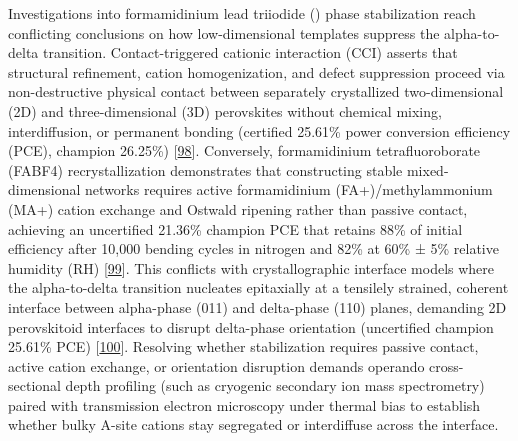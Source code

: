\documentclass[
  11pt,
]{article}
\begin{document}
Investigations into formamidinium lead triiodide () phase
stabilization reach conflicting conclusions on how low-dimensional
templates suppress the alpha-to-delta transition. Contact-triggered
cationic interaction (CCI) asserts that structural refinement, cation
homogenization, and defect suppression proceed via non-destructive
physical contact between separately crystallized two-dimensional (2D)
and three-dimensional (3D) perovskites without chemical mixing,
interdiffusion, or permanent bonding (certified 25.61\% power conversion
efficiency (PCE), champion 26.25\%)
{[}\href{https://doi.org/10.1038/s41560-026-02027-4}{98}{]}. Conversely,
formamidinium tetrafluoroborate (FABF4) recrystallization demonstrates
that constructing stable mixed-dimensional networks requires active
formamidinium (FA+)/methylammonium (MA+) cation exchange and Ostwald
ripening rather than passive contact, achieving an uncertified 21.36\%
champion PCE that retains 88\% of initial efficiency after 10,000
bending cycles in nitrogen and 82\% at 60\% ± 5\% relative humidity (RH)
{[}\href{https://doi.org/10.1002/adfm.75673}{99}{]}. This conflicts with
crystallographic interface models where the alpha-to-delta transition
nucleates epitaxially at a tensilely strained, coherent interface
between alpha-phase (011) and delta-phase (110) planes, demanding 2D
perovskitoid interfaces to disrupt delta-phase orientation (uncertified
champion 25.61\% PCE)
{[}\href{https://doi.org/10.1038/s41467-026-73739-0}{100}{]}. Resolving
whether stabilization requires passive contact, active cation exchange,
or orientation disruption demands operando cross-sectional depth
profiling (such as cryogenic secondary ion mass spectrometry) paired
with transmission electron microscopy under thermal bias to establish
whether bulky A-site cations stay segregated or interdiffuse across the
interface.
\end{document}
